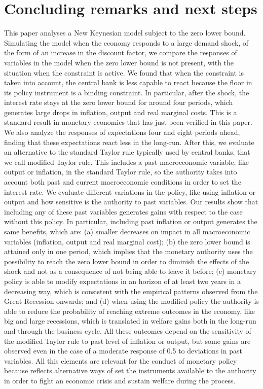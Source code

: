 \documentclass[11pt]{article}
\numberwithin{equation}{section}
\begin{document}
\section{Concluding remarks and next steps}\label{sec:conclusions}

This paper analyses a New Keynesian model subject to the zero lower bound. Simulating the model when the economy responds to a large demand shock, of the form of an increase in the discount factor, we compare the responses of variables in the model when the zero lower bound is not present, with the situation when the constraint is active. We found that when the constraint is taken into account, the central bank is less capable to react because the floor in its policy instrument is a binding constraint. In particular, after the shock, the interest rate stays at the zero lower bound for around four periods, which generates large drops in inflation, output and real marginal costs. This is a standard result in monetary economics that has just been verified in this paper. We also analyze the responses of expectations four and eight periods ahead, finding that these expectations react less in the long-run. After this, we evaluate an alternative to the standard Taylor rule typically used by central banks, that we call modified Taylor rule. This includes a past macroeconomic variable, like output or inflation, in the standard Taylor rule, so the authority takes into account both past and current macroeconomic conditions in order to set the interest rate. We evaluate different variations in the policy, like using inflation or output and how sensitive is the authority to past variables. Our results show that including any of these past variables generates gains with respect to the case without this policy. In particular, including past inflation or output generates the same benefits, which are: (a) smaller decreases on impact in all macroeconomic variables (inflation, output and real marginal cost); (b) the zero lower bound is attained only in one period, which implies that the monetary authority uses the possibility to reach the zero lower bound in order to diminish the effects of the shock and not as a consequence of not being able to leave it before; (c) monetary policy is able to modify expectations in an horizon of at least two years in a decreasing way, which is consistent with the empirical patterns observed from the Great Recession onwards; and (d) when using the modified policy the authority is able to reduce the probability of reaching extreme outcomes in the economy, like big and large recessions, which is translated in welfare gains both in the long-run and through the business cycle. All these outcomes depend on the sensitivity of the modified Taylor rule to past level of inflation or output, but some gains are observed even in the case of a moderate response of 0.5 to deviations in past variables. All this elements are relevant for the conduct of monetary policy because reflects alternative ways of set the instruments available to the authority in order to fight an economic crisis and sustain welfare during the process.
\end{document}
